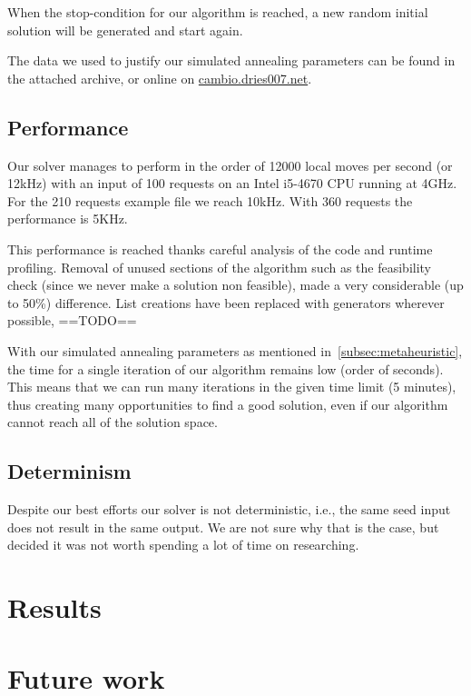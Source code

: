\documentclass[11pt,a4paper]{article}
\begin{document}
            When the stop-condition for our algorithm is reached, a new random initial solution will be generated and start again.

            The data we used to justify our simulated annealing parameters can be found in the attached archive, or online on \href{https://cambio.dries007.net/}{cambio.dries007.net}.

    \subsection{Performance}
    Our solver manages to perform in the order of 12000 local moves per second (or 12kHz) with an input of 100 requests on an Intel i5-4670 CPU running at 4GHz.
    For the 210 requests example file we reach 10kHz. With 360 requests the performance is 5KHz.

    This performance is reached thanks careful analysis of the code and runtime profiling.
    Removal of unused sections of the algorithm such as the feasibility check (since we never make a solution non feasible), made a very considerable (up to 50\%) difference.
    List creations have been replaced with generators wherever possible, ==TODO==

    With our simulated annealing parameters as mentioned in~\ref{subsec:metaheuristic}, the time for a single iteration of our algorithm remains low (order of seconds).
    This means that we can run many iterations in the given time limit (5 minutes), thus creating many opportunities to find a good solution, even if our algorithm cannot reach all of the solution space.

    \subsection{Determinism}
    Despite our best efforts our solver is not deterministic, i.e., the same seed input does not result in the same output.
    We are not sure why that is the case, but decided it was not worth spending a lot of time on researching.


\section{Results}

\section{Future work}
\end{document}
